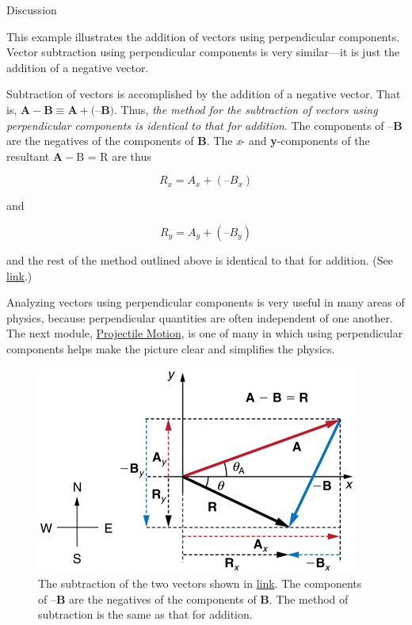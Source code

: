 \documentclass[
]{book}
\begin{document}
{Discussion}

This example illustrates the addition of vectors using perpendicular
components. Vector subtraction using perpendicular components is very
similar---it is just the addition of a negative vector.

Subtraction of vectors is accomplished by the addition of a negative
vector. That is,
\({{{\mathbf{A} - \mathbf{B}} \equiv {{\mathbf{A} + (}\mathbf{–B}}})}{}\).
Thus, \emph{the method for the subtraction of vectors using perpendicular
components is identical to that for addition}. The components of
\(\textbf{–B}{}\) are the negatives of the components of \(\mathbf{B}{}\).
The \emph{x}- and \textbf{y}-components of the resultant
\({\mathbf{A} - \text{B\ =\ R}}{}\) are thus

\leavevmode{}%
\[{R_{x} = {A_{x} + \left( –B_{x} \right)}}{}\]

and

\leavevmode{}%
\[{R_{y} = {A_{y} + \left( –B_{y} \right)}}{}\]

and the rest of the method outlined above is identical to that for
addition. (See
\protect\hyperlink{import-auto-id1165298841604}{link}.)

Analyzing vectors using perpendicular components is very useful in many
areas of physics, because perpendicular quantities are often independent
of one another. The next module, \href{/m54787}{Projectile Motion}, is one of
many in which using perpendicular components helps make the picture
clear and simplifies the physics.

\begin{figure}
\hypertarget{import-auto-id1165298841604}{%
\centering
\includegraphics{images/Figure_03_03_10a.jpg}
\caption{The subtraction of the two vectors shown in
\protect\hyperlink{import-auto-id1165298839640}{link}. The
components of \(\textbf{–B}{}\) are the negatives of the components of
\(\mathbf{B}{}\). The method of subtraction is the same as that for
addition.}\label{import-auto-id1165298841604}
}
\end{figure}
\end{document}
